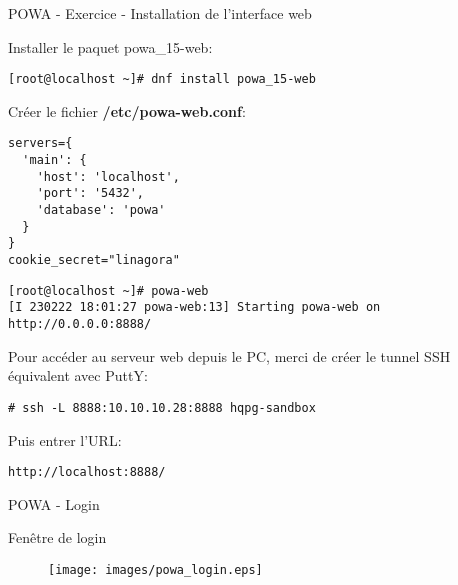 
\begin{frame}[fragile]{POWA - Exercice - Installation de l'interface web}

   Installer le paquet powa\_15-web:
\begin{tiny}
\begin{Verbatim}[commandchars=\&\{\}]
[root@localhost ~]# dnf install powa_15-web
\end{Verbatim}
\end{tiny}

   Créer le fichier \textbf{/etc/powa-web.conf}:
\begin{tiny}
\begin{Verbatim}[commandchars=\&\#\#]
servers={
  'main': {
    'host': 'localhost',
    'port': '5432',
    'database': 'powa'
  }
}
cookie_secret="linagora"
\end{Verbatim}
\end{tiny}

\begin{tiny}
\begin{Verbatim}[commandchars=\&\{\}]
[root@localhost ~]# powa-web
[I 230222 18:01:27 powa-web:13] Starting powa-web on http://0.0.0.0:8888/
\end{Verbatim}
\end{tiny}

Pour accéder au serveur web depuis le PC, merci de créer le tunnel SSH équivalent avec PuttY:
\begin{tiny}
\begin{Verbatim}[commandchars=\\\{\}]
# ssh -L 8888:10.10.10.28:8888 hqpg-sandbox
\end{Verbatim}
\end{tiny}

Puis entrer l'URL:
\begin{tiny}
\begin{Verbatim}[commandchars=\\\{\}]
http://localhost:8888/
\end{Verbatim}
\end{tiny}

\end{frame}


\begin{frame}{POWA - Login}

   Fenêtre de login

\begin{figure}
\begin{center}
\texttt{[image: images/powa\_login.eps]}
\end{center}
\end{figure}

\end{frame}

